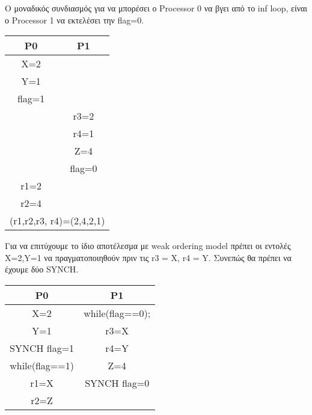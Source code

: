 \documentclass[a4paper,12pt]{article}
\begin{document}
Ο μοναδικός συνδιασμός για να μπορέσει ο Processor 0 να βγει από το inf loop, είναι ο Processor 1 να εκτελέσει την
flag=0.

\begin{table}[H]
    \centering
    \begin{tabular}{|c|c|}
        \hline
        P0     &     P1     \\
        \hline
        \hline
        X=2           &     \\
  Y=1           &           \\
  flag=1       &            \\
               &    r3=2    \\
               &    r4=1    \\
               &     Z=4    \\
               &   flag=0   \\
 r1=2          &            \\
 r2=4          &            \\
        \hline
    \multicolumn{2}{|c||}{(r1,r2,r3, r4)=(2,4,2,1)}  \\
        \hline
    \end{tabular}
\end{table}

\pagebreak

Για να επιτύχουμε το ίδιο αποτέλεσμα με weak ordering model πρέπει οι εντολές X=2,Y=1 να πραγματοποιηθούν πριν τις r3 =
X, r4 = Y. Συνεπώς θα πρέπει να έχουμε δύο SYNCH.
\begin{table}[H]
    \centering
    \begin{tabular}{|c|c|}
        \hline
        P0     &     P1     \\
        \hline
        \hline
        X=2           & while(flag==0);     \\
        Y=1           &         r3=X  \\
        SYNCH flag=1       &    r4=Y        \\
        while(flag==1)       &    Z=4    \\
        r1=X           &  SYNCH flag=0    \\
        r2=Z           &     \\
        \hline
    \end{tabular}
\end{table}
\end{document}
